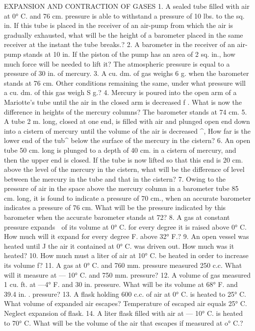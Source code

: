EXPANSION AND CONTRACTION OF GASES
1. A sealed tube filled with air at 0° C. and 76 cm. pressure is able to withstand a pressure of 10 lbs. to the sq. in. If this tube is placed in the receiver of an air-pump from which the air is gradually exhausted, what will be the height of a barometer placed in the same receiver at the instant the tube breaks.?
2. A barometer in the receiver of an air-pump stands at 10 in. If the piston of the pump has an area of 2 sq. in., how much force will be needed to lift it? The atmospheric pressure is equal to a pressure of 30 in. of mercury.
3. A cu. dm. of gas weighs 6 g. when the barometer stands at 76 cm. Other conditions remaining the same, under what pressure will a cu. dm. of this gas weigh S g.?
4. Mercury is poured into the open arm of a Mariotte's tube until the air in the closed arm is decreased f . What is now the difference in heights of the mercury columns? The barometer stands at 74 cm.
5. A tube 2 m. long, closed at one end, is filled with air and plunged open end down into a cistern of mercury until the volume of the air is decreased ^, How far is the lower end of the tub^ below the surface of the mercury in the cistern?
6. An open tube 50 cm. long is plunged to a depth of 40 cm. in a cistern of mercury, and then the upper end is closed. If the tube is now lifted so that this end is 20 cm. above the level of the mercury in the cistern, what will be the difference of level between the mercury in the tube and that in the cistern?
7. Owing to the pressure of air in the space above the mercury column in a barometer tube 85 cm. long, it is found to indicate a pressure of 70 cm., when an accurate barometer indicates a pressure of 76 cm. What will be the pressure indicated by this barometer when the accurate barometer stands at 72?
8. A gas at constant pressure expands ^^^ of its volume at 0° C. for every degree it is raised above 0° C. How much will it expand for every degree F. above 32° F.?
9. An open vessel was heated until J the air it contained at 0° C. was driven out. How much was it heated?
10. How much must a liter of air at 10° C. be heated in order to increase its volume f?
11. A gas at 0° C. and 760 mm. pressure measured 250 c.c. What will it measure at — 10° C. and 750 mm. pressure?
12. A volume of gas measured 1 cu. ft. at —4° F. and 30 in. pressure. What will be its volume at 68° F. and 39.4 in. . pressure?
13. A flask holding 600 c.c. of air at 0° C. is heated to 25° C. What volume of expanded air escapes? Temperature of escaped air equals 25° C. Neglect expansion of flask.
14. A liter flask filled with air at — 10° C. is heated to 70° C. What will be the volume of the air that escapes if measured at o° C.?

